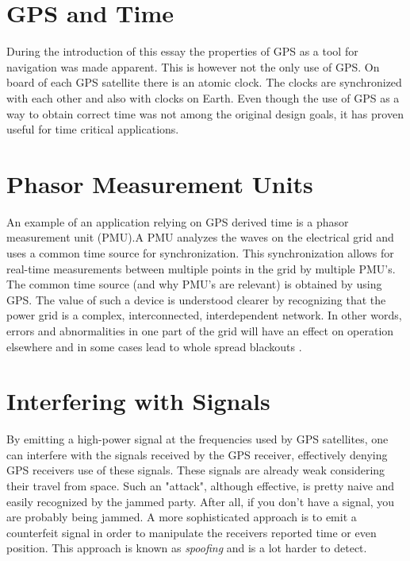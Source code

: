 \documentclass[12pt,english,a4paper]{article}
\begin{document}
\section{GPS and Time}
During the introduction of this essay the properties of GPS as a tool for navigation was made apparent. This is however not the only use of GPS. On board of each GPS satellite there is an atomic clock. The clocks are synchronized with each other and also with clocks on Earth. Even though the use of GPS as a way to obtain correct time was not among the original design goals, it has proven useful for time critical applications. 

\section{Phasor Measurement Units}
An example of an application relying on GPS derived time is a phasor measurement unit (PMU).A PMU analyzes the waves on the electrical grid and uses a common time source for synchronization. This synchronization allows for real-time measurements between multiple points in the grid by multiple PMU's. The common time source (and why PMU's are relevant) is obtained by using GPS. \cite{YLJRNR} The value of such a device is understood clearer by recognizing that the power grid is a complex, interconnected, interdependent network. In other words, errors and abnormalities in one part of the grid will have an effect on operation elsewhere and in some cases lead to whole spread blackouts \cite{EVPMUGA}.

\section{Interfering with Signals}
By emitting a high-power signal at the frequencies used by GPS satellites, one can interfere with the signals received by the GPS receiver, effectively denying GPS receivers use of these signals. These signals are already weak considering their travel from space. Such an "attack", although effective, is pretty naive and easily recognized by the jammed party. After all, if you don't have a signal, you are probably being jammed. A more sophisticated approach is to emit a counterfeit signal in order to manipulate the receivers reported time or even position. This approach is known as \textit{spoofing} and is a lot harder to detect. 
\end{document}
